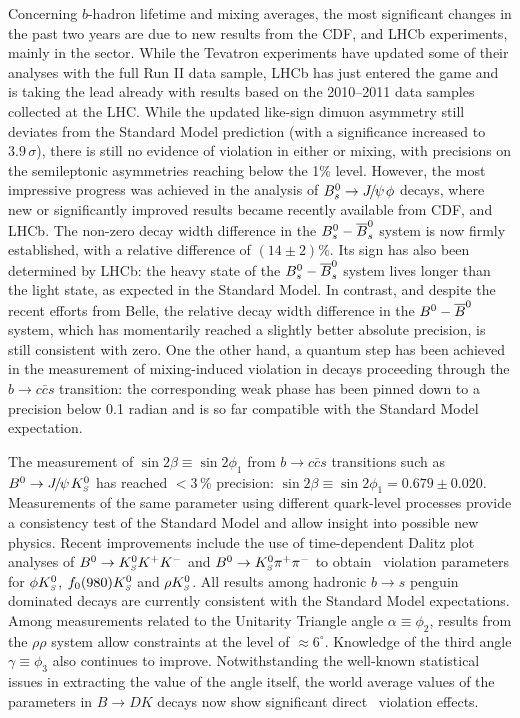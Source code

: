 Concerning $b$-hadron lifetime and mixing averages,
the most significant changes in the past two years
are due to new results from the CDF, \dzero and LHCb experiments, 
mainly in the \Bs sector. While the Tevatron 
experiments have updated some of their analyses with the 
full Run II data sample, LHCb has just entered the game 
and is taking the lead already 
with results based on the 2010--2011 data samples collected 
at the LHC.
While the updated \dzero like-sign dimuon asymmetry 
still deviates from the Standard Model prediction
(with a significance increased to $3.9\,\sigma$), 
there is still no evidence of \CP violation in either 
\Bd or \Bs mixing, with precisions on the semileptonic asymmetries 
reaching below the 1\% level. 
However, the most impressive progress was achieved in the 
analysis of $B^0_s \to{J\mskip -3mu/\mskip -2mu\psi\mskip 2mu}\phi$ decays, 
where new or significantly improved results became recently 
available from CDF, \dzero and LHCb. 
The non-zero decay width difference in the $\Bs-\Bsbar$ system 
is now firmly established, with a relative difference of
$(14\pm2)\%$.
Its sign has also been determined by LHCb: 
the heavy state of the  $\Bs-\Bsbar$ system lives longer 
than the light state, as expected in the Standard Model.
In contrast, and despite the 
recent efforts from Belle, the relative decay width difference in 
the $\Bd-\Bdbar$ system,
which has momentarily reached a slightly better absolute precision,
is still consistent with zero. 
One the other hand, a quantum step
has been achieved in the measurement of 
mixing-induced \CP violation in \Bs decays proceeding through 
the $b\to c\bar{c}s$ transition: the corresponding weak phase 
has been pinned down to a precision below 0.1 radian 
and is so far compatible with the Standard Model expectation.

The measurement of $\sin 2\beta \equiv \sin 2\phi_1$ from $b \to
c\bar{c}s$ transitions such as $B^0 \to {J\mskip -3mu/\mskip -2mu\psi\mskip 2mu}K^0_{\scriptscriptstyle S}$ has reached $<3\,\%$
precision: $\sin 2\beta \equiv \sin 2\phi_1 = 0.679 \pm 0.020$.
Measurements of the same parameter using different quark-level processes
provide a consistency test of the Standard Model and allow insight into
possible new physics.  Recent improvements include the use of
time-dependent Dalitz plot analyses of $B^0 \to K^0_{\scriptscriptstyle S}K^+K^-$ and $B^0 \to
K^0_{\scriptscriptstyle S}\pi^+\pi^-$ to obtain \CP\ violation parameters for $\phi K^0_{\scriptscriptstyle S}$,
$f_0(980)K^0_{\scriptscriptstyle S}$ and $\rho K^0_{\scriptscriptstyle S}$.  All results among hadronic $b \to s$
penguin dominated decays are currently consistent with the Standard
Model expectations.  Among measurements related to the Unitarity
Triangle angle $\alpha \equiv \phi_2$, results from the
$\rho\rho$ system allow constraints at the level of $\approx
6^\circ$.  Knowledge of the third angle $\gamma \equiv \phi_3$ also
continues to improve.  Notwithstanding the well-known statistical issues
in extracting the value of the angle itself, the world average values of
the parameters in $B \to DK$ decays now show significant direct 
\CP\ violation effects.

